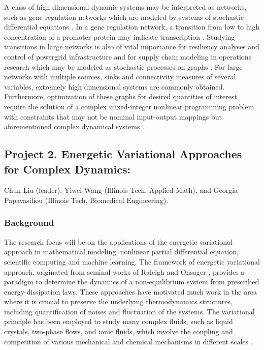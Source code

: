 \documentclass[11pt]{NSFamsart}
\begin{document}
A class of high dimensional dynamic systems may be interpreted as networks, such as   gene regulation networks \cite{Raser2005} which are modeled by systems of stochastic differential equations \cite{Suel06}.  In a gene regulation network, a transition from low to high concentration of a promoter protein may indicate transcription \cite{Stefan,ZLDK}. Studying transitions in large networks is also of vital importance for resiliency analyses and control of powergrid infrastructure and for supply chain modeling in operations research which may be modeled as stochastic processes on graphs \cite{shin2020graph,anghel2007stochastic,nardelli2014models}. For large networks with multiple sources, sinks and connectivity measures of several variables, extremely high dimensional systems are commonly obtained. Furthermore, optimization of these graphs for desired quantities of interest require the solution of a complex mixed-integer nonlinear programming problem with constraints that may not be nominal input-output mappings but aforementioned complex dynamical systems \cite{shin2020decentralized,sampat2017optimization,kim2019graph,shin2021exponential}.


\subsection*{Project 2. Energetic Variational Approaches for Complex Dynamics:}
Chun Liu (leader), Yiwei Wang (Illinois Tech, Applied Math), and Georgia Papavasiliou (Illinois Tech, Biomedical Engineering).

\subsubsection*{Background} The research focus will be on the applications of the energetic variational approach in mathematical modeling, nonlinear partial differential equation, scientific computing and machine learning. The framework of energetic variational approach, originated from seminal works of Raleigh \cite{strutt1871some} and Onsager \cite{onsager1931reciprocal,onsager1931reciprocal2}, provides a paradigm to determine the dynamics of a non-equilibrium system from prescribed energy-dissipation laws.
These approaches have motivated much work in the area where it is crucial to preserve the underlying
thermodynamics structures, including quantification of noises and fluctuation of the systems.
The variational principle has been employed to study many complex fluids, such as liquid crystals, two-phase flows, and ionic fluids, which involve the coupling and competition of various mechanical and chemical mechanisms in different scales \cite{lin2001static, feng2005energetic, LiLiZh05, Lin2007, liu2009introduction, du2009energetic, sun2009energetic, eisenberg2010energy, Giga2017, Liu2019, knopf2020phase}.
\end{document}
